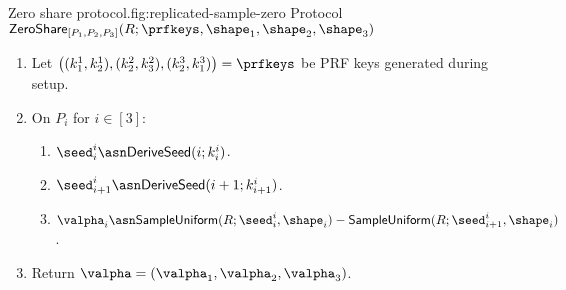 \begin{Boxfig}{Zero share protocol.}{fig:replicated-sample-zero}
  {Protocol $\mathsf{ZeroShare}_{[P_1, P_2, P_3]}(R; \prfkeys, \shape_1, \shape_2, \shape_3)$}
  
  \begin{enumerate}
  \item Let $\left( (k_1^1, k_2^1), (k_2^2, k_3^2), (k_2^3, k_1^3) \right) = \prfkeys$ be PRF keys generated during setup.
  
  \item On $P_i$ for $i \in [3]$:
  \begin{enumerate}
    \item ${\seed}^i_i \asn \mathsf{DeriveSeed}(i; k^i_i)$.
    \item ${\seed}^i_{i+1} \asn \mathsf{DeriveSeed}(i + 1; k^i_{i+1})$.
    \item $\valpha_i \asn \mathsf{SampleUniform}(R; \seed^i_i, \shape_i) - \mathsf{SampleUniform}(R; \seed^i_{i+1}, \shape_i)$.
  \end{enumerate}
  
  \item Return $\valpha = \left( \valpha_1, \valpha_2, \valpha_3 \right)$.
  \end{enumerate}
\end{Boxfig}
